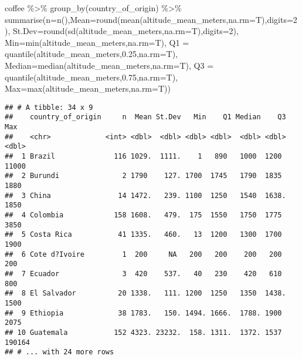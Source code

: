 \documentclass[
]{article}
\newenvironment{Shaded}{\begin{snugshade}}{\end{snugshade}}
\newcommand{\AttributeTok}[1]{\textcolor[rgb]{0.77,0.63,0.00}{#1}}
\newcommand{\DecValTok}[1]{\textcolor[rgb]{0.00,0.00,0.81}{#1}}
\newcommand{\FloatTok}[1]{\textcolor[rgb]{0.00,0.00,0.81}{#1}}
\newcommand{\FunctionTok}[1]{\textcolor[rgb]{0.00,0.00,0.00}{#1}}
\newcommand{\NormalTok}[1]{#1}
\newcommand{\SpecialCharTok}[1]{\textcolor[rgb]{0.00,0.00,0.00}{#1}}
\begin{document}
\begin{Shaded}
\begin{Highlighting}[]
\NormalTok{coffee }\SpecialCharTok{\%\textgreater{}\%}
  \FunctionTok{group\_by}\NormalTok{(country\_of\_origin) }\SpecialCharTok{\%\textgreater{}\%}
  \FunctionTok{summarise}\NormalTok{(}\AttributeTok{n=}\FunctionTok{n}\NormalTok{(),}\AttributeTok{Mean=}\FunctionTok{round}\NormalTok{(}\FunctionTok{mean}\NormalTok{(altitude\_mean\_meters,}\AttributeTok{na.rm=}\NormalTok{T),}\AttributeTok{digits=}\DecValTok{2}\NormalTok{), }\AttributeTok{St.Dev=}\FunctionTok{round}\NormalTok{(}\FunctionTok{sd}\NormalTok{(altitude\_mean\_meters,}\AttributeTok{na.rm=}\NormalTok{T),}\AttributeTok{digits=}\DecValTok{2}\NormalTok{),}
            \AttributeTok{Min=}\FunctionTok{min}\NormalTok{(altitude\_mean\_meters,}\AttributeTok{na.rm=}\NormalTok{T), }\AttributeTok{Q1 =} \FunctionTok{quantile}\NormalTok{(altitude\_mean\_meters,}\FloatTok{0.25}\NormalTok{,}\AttributeTok{na.rm=}\NormalTok{T), }\AttributeTok{Median=}\FunctionTok{median}\NormalTok{(altitude\_mean\_meters,}\AttributeTok{na.rm=}\NormalTok{T),}
            \AttributeTok{Q3 =} \FunctionTok{quantile}\NormalTok{(altitude\_mean\_meters,}\FloatTok{0.75}\NormalTok{,}\AttributeTok{na.rm=}\NormalTok{T), }\AttributeTok{Max=}\FunctionTok{max}\NormalTok{(altitude\_mean\_meters,}\AttributeTok{na.rm=}\NormalTok{T))}
\end{Highlighting}
\end{Shaded}

\begin{verbatim}
## # A tibble: 34 x 9
##    country_of_origin     n  Mean St.Dev   Min    Q1 Median    Q3    Max
##    <chr>             <int> <dbl>  <dbl> <dbl> <dbl>  <dbl> <dbl>  <dbl>
##  1 Brazil              116 1029.  1111.    1   890   1000  1200   11000
##  2 Burundi               2 1790    127. 1700  1745   1790  1835    1880
##  3 China                14 1472.   239. 1100  1250   1540  1638.   1850
##  4 Colombia            158 1608.   479.  175  1550   1750  1775    3850
##  5 Costa Rica           41 1335.   460.   13  1200   1300  1700    1900
##  6 Cote d?Ivoire         1  200     NA   200   200    200   200     200
##  7 Ecuador               3  420    537.   40   230    420   610     800
##  8 El Salvador          20 1338.   111. 1200  1250   1350  1438.   1500
##  9 Ethiopia             38 1783.   150. 1494. 1666.  1788. 1900    2075
## 10 Guatemala           152 4323. 23232.  158. 1311.  1372. 1537  190164
## # ... with 24 more rows
\end{verbatim}
\end{document}
